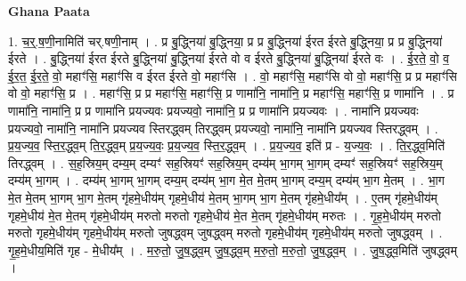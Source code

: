 \documentclass[17pt]{extarticle}
\begin{document}
\textbf{Ghana Paata } \newline

1. च॒र्॒.ष॒णी॒नामिति॑ चर्.षणी॒नाम् । . प्र बु॒द्ध्निया॑ बु॒द्ध्निया॒ प्र प्र बु॒द्ध्निया॑ ईरत ईरते बु॒द्ध्निया॒ प्र प्र बु॒द्ध्निया॑ ईरते । . बु॒द्ध्निया॑ ईरत ईरते बु॒द्ध्निया॑ बु॒द्ध्निया॑ ईरते वो व ईरते बु॒द्ध्निया॑ बु॒द्ध्निया॑ ईरते वः । . ई॒र॒ते॒ वो॒ व॒ ई॒र॒त॒ ई॒र॒ते॒ वो॒ महाꣳ॑सि॒ महाꣳ॑सि व ईरत ईरते वो॒ महाꣳ॑सि । . वो॒ महाꣳ॑सि॒ महाꣳ॑सि वो वो॒ महाꣳ॑सि॒ प्र प्र महाꣳ॑सि वो वो॒ महाꣳ॑सि॒ प्र । . महाꣳ॑सि॒ प्र प्र महाꣳ॑सि॒ महाꣳ॑सि॒ प्र णामा॑नि॒ नामा॑नि॒ प्र महाꣳ॑सि॒ महाꣳ॑सि॒ प्र णामा॑नि । . प्र णामा॑नि॒ नामा॑नि॒ प्र प्र णामा॑नि प्रयज्यवः प्रयज्यवो॒ नामा॑नि॒ प्र प्र णामा॑नि प्रयज्यवः । . नामा॑नि प्रयज्यवः प्रयज्यवो॒ नामा॑नि॒ नामा॑नि प्रयज्यव स्तिरद्ध्वम् तिरद्ध्वम् प्रयज्यवो॒ नामा॑नि॒ नामा॑नि प्रयज्यव स्तिरद्ध्वम् । . प्र॒य॒ज्य॒व॒ स्ति॒र॒द्ध्व॒म् ति॒र॒द्ध्व॒म् प्र॒य॒ज्य॒वः॒ प्र॒य॒ज्य॒व॒ स्ति॒र॒द्ध्व॒म् । . प्र॒य॒ज्य॒व॒ इति॑ प्र - य॒ज्य॒वः॒ । . ति॒र॒द्ध्व॒मिति॑ तिरद्ध्वम् । . स॒ह॒स्रिय॒म् दम्य॒म् दम्यꣳ॑ सह॒स्रियꣳ॑ सह॒स्रिय॒म् दम्य॑म् भा॒गम् भा॒गम् दम्यꣳ॑ सह॒स्रियꣳ॑ सह॒स्रिय॒म् दम्य॑म् भा॒गम् । . दम्य॑म् भा॒गम् भा॒गम् दम्य॒म् दम्य॑म् भा॒ग मे॒त मे॒तम् भा॒गम् दम्य॒म् दम्य॑म् भा॒ग मे॒तम् । . भा॒ग मे॒त मे॒तम् भा॒गम् भा॒ग मे॒तम् गृ॑हमे॒धीय॑म् गृहमे॒धीय॑ मे॒तम् भा॒गम् भा॒ग मे॒तम् गृ॑हमे॒धीय᳚म् । . ए॒तम् गृ॑हमे॒धीय॑म् गृहमे॒धीय॑ मे॒त मे॒तम् गृ॑हमे॒धीय॑म् मरुतो मरुतो गृहमे॒धीय॑ मे॒त मे॒तम् गृ॑हमे॒धीय॑म् मरुतः । . गृ॒ह॒मे॒धीय॑म् मरुतो मरुतो गृहमे॒धीय॑म् गृहमे॒धीय॑म् मरुतो जुषद्ध्वम् जुषद्ध्वम् मरुतो गृहमे॒धीय॑म् गृहमे॒धीय॑म् मरुतो जुषद्ध्वम् । . गृ॒ह॒मे॒धीय॒मिति॑ गृह - मे॒धीय᳚म् । . म॒रु॒तो॒ जु॒ष॒द्ध्व॒म् जु॒ष॒द्ध्व॒म् म॒रु॒तो॒ म॒रु॒तो॒ जु॒ष॒द्ध्व॒म् । . जु॒ष॒द्ध्व॒मिति॑ जुषद्ध्वम् । \newline
\end{document}

